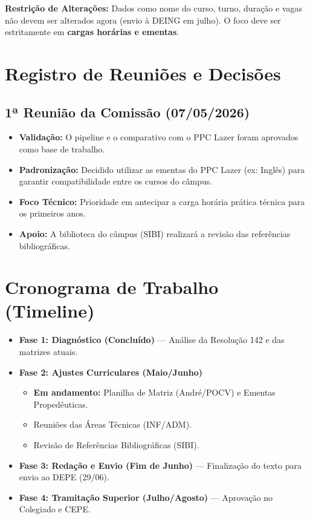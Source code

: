 \documentclass[a4paper,12pt]{article}
\begin{document}
\begin{important}
\textbf{Restrição de Alterações:} Dados como nome do curso, turno, duração e vagas não devem ser alterados agora (envio à DEING em julho). O foco deve ser estritamente em \textbf{cargas horárias e ementas}.
\end{important}

\section{Registro de Reuniões e Decisões}

\subsection*{1ª Reunião da Comissão (07/05/2026)}
\begin{itemize}
    \item \textbf{Validação:} O pipeline e o comparativo com o PPC Lazer foram aprovados como base de trabalho.
    \item \textbf{Padronização:} Decidido utilizar as ementas do PPC Lazer (ex: Inglês) para garantir compatibilidade entre os cursos do câmpus.
    \item \textbf{Foco Técnico:} Prioridade em antecipar a carga horária prática técnica para os primeiros anos.
    \item \textbf{Apoio:} A biblioteca do câmpus (SIBI) realizará a revisão das referências bibliográficas.
\end{itemize}

\section{Cronograma de Trabalho (Timeline)}

\begin{itemize}
    \item \textbf{Fase 1: Diagnóstico (Concluído)} --- Análise da Resolução 142 e das matrizes atuais.
    \item \textbf{Fase 2: Ajustes Curriculares (Maio/Junho)}
    \begin{itemize}
        \item \textbf{Em andamento:} Planilha de Matriz (André/POCV) e Ementas Propedêuticas.
        \item Reuniões das Áreas Técnicas (INF/ADM).
        \item Revisão de Referências Bibliográficas (SIBI).
    \end{itemize}
    \item \textbf{Fase 3: Redação e Envio (Fim de Junho)} --- Finalização do texto para envio ao DEPE (29/06).
    \item \textbf{Fase 4: Tramitação Superior (Julho/Agosto)} --- Aprovação no Colegiado e CEPE.
\end{itemize}
\end{document}
